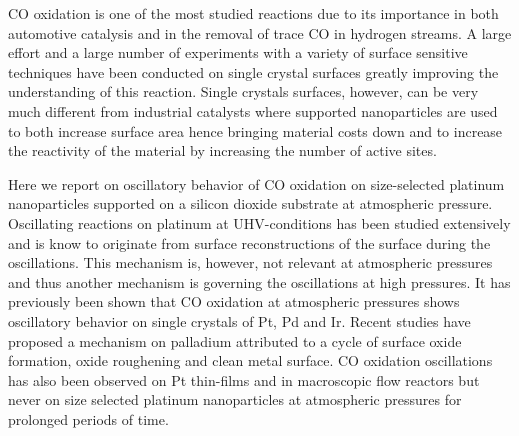 \documentclass[8.5pt,twoside,twocolumn]{article}
\begin{document}




CO oxidation is one of the most studied reactions due to its importance in both automotive catalysis and in the removal of trace CO in hydrogen streams. A large effort and a large number of experiments with a variety of surface sensitive techniques have been conducted on single crystal surfaces greatly improving the understanding of this reaction. Single crystals surfaces, however, can be very much different from industrial catalysts where supported nanoparticles are used to both increase surface area hence bringing material costs down and to increase the reactivity of the material by increasing the number of active sites. 

Here we report on oscillatory behavior of CO oxidation on size-selected platinum nanoparticles supported on a silicon dioxide substrate at atmospheric pressure. Oscillating reactions on platinum at UHV-conditions has been studied extensively and is know to originate from surface reconstructions of the surface during the oscillations\cite{Ertl2008}. This mechanism is, however, not relevant at atmospheric pressures and thus another mechanism is governing the oscillations at high pressures. It has previously been shown\cite{SALES1982} that CO oxidation at atmospheric pressures shows oscillatory behavior on single crystals of Pt, Pd and Ir. Recent studies have proposed a mechanism on palladium \cite{Hendriksen2010} attributed to a cycle of surface oxide formation, oxide roughening and clean metal surface. CO oxidation oscillations has also been observed on Pt thin-films\cite{Lund2000} and in macroscopic flow reactors\cite{Singh2010} but never on size selected platinum nanoparticles at atmospheric pressures for prolonged periods of time.
\end{document}

